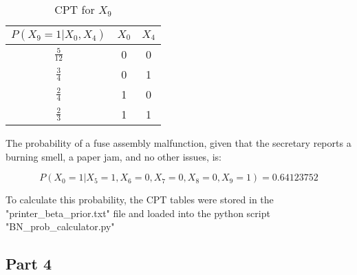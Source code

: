 \documentclass{article}
\begin{document}
\begin{table}[H]
\centering
\begin{tabular}{|c|c|c|}
\hline
$P(X_9 = 1 | X_0, X_4)$ & $X_0$ & $X_4$ \\ \hline
$\frac{5}{12}$ & 0 & 0 \\ \hline
$\frac{3}{4}$ & 0 & 1 \\ \hline
$\frac{2}{4}$ & 1 & 0 \\ \hline
$\frac{2}{3}$ & 1 & 1 \\ \hline
\end{tabular}
\caption{CPT for $X_9$}
\end{table}


The probability of a fuse assembly malfunction, given that the secretary reports a burning smell, a paper jam, and no other issues, is:

\[
P(X_0 = 1 | X_5 = 1, X_6 = 0, X_7 = 0, X_8 = 0, X_9 = 1) = 0.64123752
\]


To calculate this probability, the CPT tables were stored in the "printer\_beta\_prior.txt" file and loaded into the python script "BN\_prob\_calculator.py"


\subsection*{Part 4}
\end{document}
